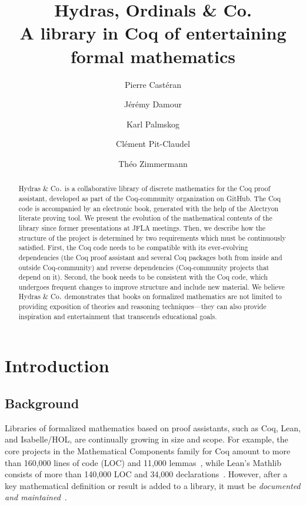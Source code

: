 \documentclass{easychair}
\title{Hydras,  Ordinals \& Co.   \\
  A library in Coq of entertaining formal mathematics}
\author{
Pierre Castéran \inst{1}
\and
    Jérémy Damour \inst{2}
\and
Karl Palmskog \inst{3}
\and Clément Pit-Claudel \inst{4}
\and Théo Zimmermann \inst{5}
}
\institute{
Univ. Bordeaux, CNRS, Bordeaux INP, LaBRI, UMR 5800, F-33400 Talence, France  %
\and
Univ. de Paris, F-75013 Paris, France
\and
KTH Royal Institute of Technology, Stockholm, Sweden
\and
MIT CSAIL, Cambridge, Massachusetts, USA
\and
Inria, Univ. de Paris, CNRS, IRIF, UMR 8243, F-75013 Paris, France
}
\newcommand{\coq}{Coq\xspace}
\newcommand{\community}{Coq-community\xspace}
\newcommand{\alectr}{Alectryon\xspace}
\newcommand{\Hydras}{Hydras \& Co$\text.$\xspace}
\begin{document}
\maketitle


\begin{abstract}
  \Hydras is a collaborative library of discrete mathematics for the
  \coq proof assistant, developed as part of the \community organization
  on GitHub. The Coq code is accompanied
  by an electronic book, generated with the help of the \alectr
  literate proving tool. We present the evolution of the mathematical
  contents of the library since former presentations at JFLA meetings.
  Then, we describe how the structure of the project is determined
  by two requirements which must be continuously satisfied.
  First, the Coq code needs to be compatible with its ever-evolving
  dependencies (the Coq proof assistant and several Coq packages both from
  inside and outside \community) and reverse dependencies (\community
  projects that depend on it). Second, the book needs to be consistent
  with the Coq code, which undergoes frequent changes to improve
  structure and include new material. We believe \Hydras demonstrates
  that books on formalized mathematics are not limited to
  providing exposition of theories and reasoning techniques---they
  can also provide inspiration and entertainment that transcends educational goals.
\end{abstract}




\section{Introduction}
\label{sect:introduction}

\subsection{Background}

Libraries of formalized mathematics based on proof assistants, such as \coq, Lean, and Isabelle/HOL, are continually growing in size and scope.
For example, the core projects in the Mathematical Components family for Coq amount to more than 160,000 lines of code (LOC) and 11,000 lemmas~\cite{Nie2020a}, while Lean's Mathlib consists of more than 140,000 LOC and 34,000 declarations~\cite{Mathlib}. However, after a key mathematical definition or result is added to a library, it must be \emph{documented and maintained}~\cite{vanDoorn2020,alectryonpaper}.
\end{document}
